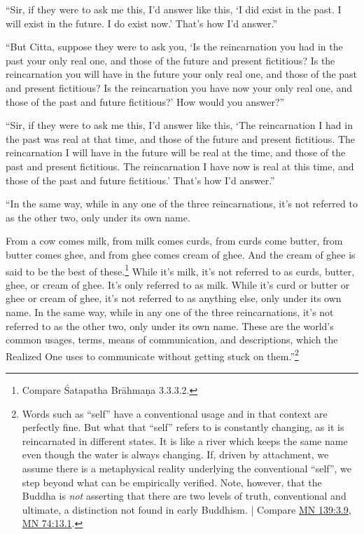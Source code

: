 \documentclass[12pt,openany]{book}%
\begin{document}
“Sir, if they were to ask me this, I’d answer like this, ‘I did exist in the past. I will exist in the future. I do exist now.’ That’s how I’d answer.” 

“But Citta, suppose they were to ask you, ‘Is the reincarnation you had in the past your only real one, and those of the future and present fictitious? Is the reincarnation you will have in the future your only real one, and those of the past and present fictitious? Is the reincarnation you have now your only real one, and those of the past and future fictitious?’ How would you answer?” 

“Sir, if they were to ask me this, I’d answer like this, ‘The reincarnation I had in the past was real at that time, and those of the future and present fictitious. The reincarnation I will have in the future will be real at the time, and those of the past and present fictitious. The reincarnation I have now is real at this time, and those of the past and future fictitious.’ That’s how I’d answer.” 

“In the same way, while in any one of the three reincarnations, it’s not referred to as the other two, only under its own name. 

From a cow comes milk, from milk comes curds, from curds come butter, from butter comes ghee, and from ghee comes cream of ghee. And the cream of ghee is said to be the best of these.\footnote{Compare Śatapatha \textsanskrit{Brāhmaṇa} 3.3.3.2. } While it’s milk, it’s not referred to as curds, butter, ghee, or cream of ghee. It’s only referred to as milk. While it’s curd or butter or ghee or cream of ghee, it’s not referred to as anything else, only under its own name. In the same way, while in any one of the three reincarnations, it’s not referred to as the other two, only under its own name. These are the world’s common usages, terms, means of communication, and descriptions, which the Realized One uses to communicate without getting stuck on them.”\footnote{Words such as “self” have a conventional usage and in that context are perfectly fine. But what that “self” refers to is constantly changing, as it is reincarnated in different states. It is like a river which keeps the same name even though the water is always changing. If, driven by attachment, we assume there is a metaphysical reality underlying the conventional “self”, we step beyond what can be empirically verified. Note, however, that the Buddha is \emph{not} asserting that there are two levels of truth, conventional and ultimate, a distinction not found in early Buddhism. | Compare \href{https://suttacentral.net/mn139/en/sujato\#3.9}{MN 139:3.9}, \href{https://suttacentral.net/mn74/en/sujato\#13.1}{MN 74:13.1}. } 
\end{document}
